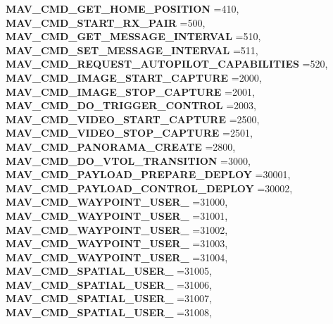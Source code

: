 \begin{DoxyCompactItemize}
\textbf{ M\+A\+V\+\_\+\+C\+M\+D\+\_\+\+G\+E\+T\+\_\+\+H\+O\+M\+E\+\_\+\+P\+O\+S\+I\+T\+I\+ON} =410, 
\textbf{ M\+A\+V\+\_\+\+C\+M\+D\+\_\+\+S\+T\+A\+R\+T\+\_\+\+R\+X\+\_\+\+P\+A\+IR} =500, 
\textbf{ M\+A\+V\+\_\+\+C\+M\+D\+\_\+\+G\+E\+T\+\_\+\+M\+E\+S\+S\+A\+G\+E\+\_\+\+I\+N\+T\+E\+R\+V\+AL} =510, 
\textbf{ M\+A\+V\+\_\+\+C\+M\+D\+\_\+\+S\+E\+T\+\_\+\+M\+E\+S\+S\+A\+G\+E\+\_\+\+I\+N\+T\+E\+R\+V\+AL} =511, 
\newline
\textbf{ M\+A\+V\+\_\+\+C\+M\+D\+\_\+\+R\+E\+Q\+U\+E\+S\+T\+\_\+\+A\+U\+T\+O\+P\+I\+L\+O\+T\+\_\+\+C\+A\+P\+A\+B\+I\+L\+I\+T\+I\+ES} =520, 
\textbf{ M\+A\+V\+\_\+\+C\+M\+D\+\_\+\+I\+M\+A\+G\+E\+\_\+\+S\+T\+A\+R\+T\+\_\+\+C\+A\+P\+T\+U\+RE} =2000, 
\textbf{ M\+A\+V\+\_\+\+C\+M\+D\+\_\+\+I\+M\+A\+G\+E\+\_\+\+S\+T\+O\+P\+\_\+\+C\+A\+P\+T\+U\+RE} =2001, 
\textbf{ M\+A\+V\+\_\+\+C\+M\+D\+\_\+\+D\+O\+\_\+\+T\+R\+I\+G\+G\+E\+R\+\_\+\+C\+O\+N\+T\+R\+OL} =2003, 
\newline
\textbf{ M\+A\+V\+\_\+\+C\+M\+D\+\_\+\+V\+I\+D\+E\+O\+\_\+\+S\+T\+A\+R\+T\+\_\+\+C\+A\+P\+T\+U\+RE} =2500, 
\textbf{ M\+A\+V\+\_\+\+C\+M\+D\+\_\+\+V\+I\+D\+E\+O\+\_\+\+S\+T\+O\+P\+\_\+\+C\+A\+P\+T\+U\+RE} =2501, 
\textbf{ M\+A\+V\+\_\+\+C\+M\+D\+\_\+\+P\+A\+N\+O\+R\+A\+M\+A\+\_\+\+C\+R\+E\+A\+TE} =2800, 
\textbf{ M\+A\+V\+\_\+\+C\+M\+D\+\_\+\+D\+O\+\_\+\+V\+T\+O\+L\+\_\+\+T\+R\+A\+N\+S\+I\+T\+I\+ON} =3000, 
\newline
\textbf{ M\+A\+V\+\_\+\+C\+M\+D\+\_\+\+P\+A\+Y\+L\+O\+A\+D\+\_\+\+P\+R\+E\+P\+A\+R\+E\+\_\+\+D\+E\+P\+L\+OY} =30001, 
\textbf{ M\+A\+V\+\_\+\+C\+M\+D\+\_\+\+P\+A\+Y\+L\+O\+A\+D\+\_\+\+C\+O\+N\+T\+R\+O\+L\+\_\+\+D\+E\+P\+L\+OY} =30002, 
\textbf{ M\+A\+V\+\_\+\+C\+M\+D\+\_\+\+W\+A\+Y\+P\+O\+I\+N\+T\+\_\+\+U\+S\+E\+R\+\_} =31000, 
\textbf{ M\+A\+V\+\_\+\+C\+M\+D\+\_\+\+W\+A\+Y\+P\+O\+I\+N\+T\+\_\+\+U\+S\+E\+R\+\_} =31001, 
\newline
\textbf{ M\+A\+V\+\_\+\+C\+M\+D\+\_\+\+W\+A\+Y\+P\+O\+I\+N\+T\+\_\+\+U\+S\+E\+R\+\_} =31002, 
\textbf{ M\+A\+V\+\_\+\+C\+M\+D\+\_\+\+W\+A\+Y\+P\+O\+I\+N\+T\+\_\+\+U\+S\+E\+R\+\_} =31003, 
\textbf{ M\+A\+V\+\_\+\+C\+M\+D\+\_\+\+W\+A\+Y\+P\+O\+I\+N\+T\+\_\+\+U\+S\+E\+R\+\_} =31004, 
\textbf{ M\+A\+V\+\_\+\+C\+M\+D\+\_\+\+S\+P\+A\+T\+I\+A\+L\+\_\+\+U\+S\+E\+R\+\_} =31005, 
\newline
\textbf{ M\+A\+V\+\_\+\+C\+M\+D\+\_\+\+S\+P\+A\+T\+I\+A\+L\+\_\+\+U\+S\+E\+R\+\_} =31006, 
\textbf{ M\+A\+V\+\_\+\+C\+M\+D\+\_\+\+S\+P\+A\+T\+I\+A\+L\+\_\+\+U\+S\+E\+R\+\_} =31007, 
\textbf{ M\+A\+V\+\_\+\+C\+M\+D\+\_\+\+S\+P\+A\+T\+I\+A\+L\+\_\+\+U\+S\+E\+R\+\_} =31008, 

\end{DoxyCompactItemize}
